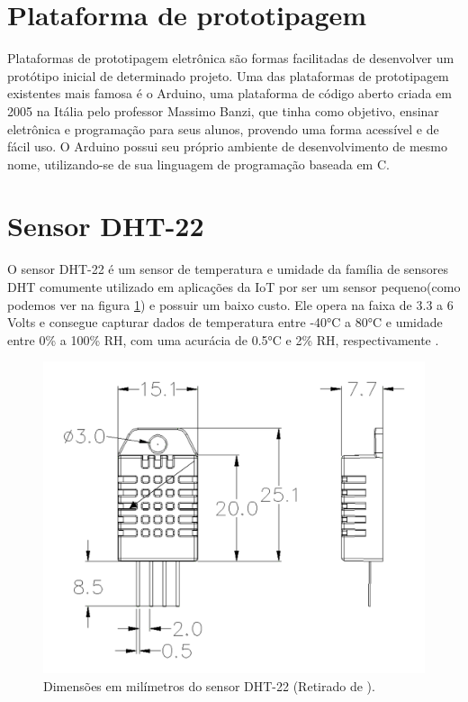 \section{Plataforma de prototipagem}
\label{fund:plataforma-proto}
Plataformas de prototipagem eletrônica são formas facilitadas de desenvolver um protótipo inicial de determinado projeto. Uma das plataformas de prototipagem existentes mais famosa é o Arduino, uma plataforma de código aberto criada em 2005 na Itália pelo professor Massimo Banzi, que tinha como objetivo, ensinar eletrônica e programação para seus alunos, provendo uma forma acessível e de fácil uso. O Arduino possui seu próprio ambiente de desenvolvimento de mesmo nome, utilizando-se de sua linguagem de programação baseada em C.

\section{Sensor DHT-22}
\label{fund:dht-22}
O sensor DHT-22 é um sensor de temperatura e umidade da família de sensores DHT comumente utilizado em aplicações da IoT por ser um sensor pequeno(como podemos ver na figura \ref{fig:dht-22}) e possuir um baixo custo. Ele opera na faixa de 3.3 a 6 Volts e consegue capturar dados de temperatura entre -40°C a 80°C e umidade entre 0\% a 100\% RH, com uma acurácia de 0.5°C e 2\% RH, respectivamente \cite{datasheetDHT22}.

\begin{figure}[H]
  \centering
  \includegraphics[width=.80\textwidth]{assets/dht-22.png} 
  \caption{Dimensões em milímetros do sensor DHT-22 (Retirado de \cite{datasheetDHT22}).}
  \label{fig:dht-22} 
\end{figure}

